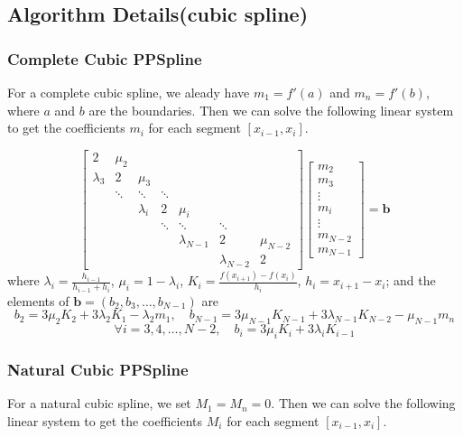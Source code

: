 \documentclass[a4paper]{article}
\begin{document}
\subsection{Algorithm Details(cubic spline)}

\subsubsection{Complete Cubic PPSpline}

For a complete cubic spline, we aleady have $m_1 = f'(a)$ and $m_n = f'(b)$, where $a$ and $b$ are the boundaries. Then we can solve the following linear system to get the coefficients $m_i$ for each segment $[x_{i-1}, x_i]$.

\[
\begin{bmatrix}
2 & \mu_2 &  &  &  &  \\
\lambda_3 & 2 & \mu_3 &  &  &  \\
 & \ddots & \ddots & \ddots &  &  \\
 &  & \lambda_i & 2 & \mu_i &  \\
 &  &  & \ddots & \ddots & \ddots \\
 &  &  &  & \lambda_{N-1} & 2 & \mu_{N-2} \\
 &  &  &  &  & \lambda_{N-2} & 2
\end{bmatrix}
\begin{bmatrix}
m_2 \\
m_3 \\
\vdots \\
m_i \\
\vdots \\
m_{N-2} \\
m_{N-1}
\end{bmatrix}
=
\mathbf{b}
\]
where $\lambda_i = \frac{h_{i-1}}{h_{i-1} + h_i}$, $\mu_i = 1 - \lambda_i$, $K_i = \frac{f(x_{i+1}) - f(x_i)}{h_i}$, $h_i = x_{i+1} - x_i$; and the elements of $\mathbf{b} = (b_2, b_3, \dots, b_{N-1})$ are
\[b_2 =  3 \mu_2 K_2 + 3\lambda_2 K_1 -\lambda_2 m_1, \quad b_{N-1} = 3 \mu_{N-1} K_{N-1} + 3\lambda_{N-1} K_{N-2} - \mu_{N-1} m_n \]
\[\forall i = 3, 4 ,\ldots, N-2, \quad 
b_i = 3 \mu_i K_i + 3\lambda_i K_{i-1} \]
\subsubsection{Natural Cubic PPSpline}

For a natural cubic spline, we set $M_1 = M_n = 0$. Then we can solve the following linear system to get the coefficients $M_i$ for each segment $[x_{i-1}, x_i]$.
\end{document}
